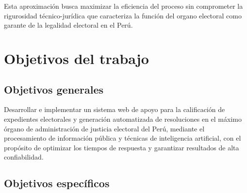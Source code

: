\documentclass[12pt,a4paper,oneside]{book}
\begin{document}
Esta aproximación busca maximizar la eficiencia del proceso sin comprometer la rigurosidad técnico-jurídica que caracteriza la función del organo electoral como garante de la legalidad electoral en el Perú.

\section{Objetivos del trabajo}
\label{sec:objetivos}

\subsection{Objetivos generales}
\label{subsec:objetivos-generales}

Desarrollar e implementar un sistema web de apoyo para la calificación de expedientes electorales y generación automatizada de resoluciones en el máximo órgano de administración de justicia electoral del Perú, mediante el procesamiento de información pública y técnicas de inteligencia artificial, con el propósito de optimizar los tiempos de respuesta y garantizar resultados de alta confiabilidad.

\subsection{Objetivos específicos}
\label{subsec:objetivos-especificos}
\end{document}
